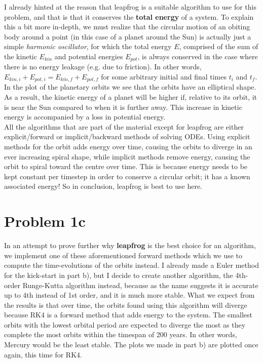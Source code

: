 I already hinted at the reason that leapfrog is a suitable algorithm to use for this problem, and that is that it conserves the \textbf{total energy} of a system. To explain this a bit more in-depth, we must realize that the circular motion of an obiting body around a point (in this case of a planet around the Sun) is actually just a simple \textit{harmonic oscillator}, for which the total energy $E$, comprised of the sum of the kinetic $E_{kin}$ and potential energies $E_{pot}$, is always conserved in the case where there is no energy leakage (e.g. due to friction). In other words, $E_{kin,i} + E_{pot,i} = E_{kin,f} + E_{pot,f}$ for some arbitrary initial and final times $t_i$ and $t_f$. In the plot of the planetary orbits we see that the orbits have an elliptical shape. As a result, the kinetic energy of a planet will be higher if, relative to its orbit, it is near the Sun compared to when it is further away. This increase in kinetic energy is accompanied by a loss in potential energy.\\

All the algorithms that are part of the material except for leapfrog are either explicit/forward or implicit/backward methods of solving ODEs. Using explicit methods for the orbit adds energy over time, causing the orbits to diverge in an ever increasing spiral shape, while implicit methods remove energy, causing the orbit to spiral toward the centre over time. This is because energy needs to be kept constant per timestep in order to conserve a circular orbit; it has a known associated energy! So in conclusion, leapfrog is best to use here. 

\section*{Problem 1c}

In an attempt to prove further why \textbf{leapfrog} is the best choice for an algorithm, we implement one of these aforementioned forward methods which we use to compute the time-evolutions of the orbits instead. I already made a Euler method for the kick-start in part b), but I decide to create another algorithm, the 4th-order Runge-Kutta algorithm instead, because as the name suggests it is accurate up to 4th instead of 1st order, and it is much more stable. What we expect from the results is that over time, the orbits found using this algorithm will diverge because RK4 is a forward method that adds energy to the system. The smallest orbits with the lowest orbital period are expected to diverge the most as they complete the most orbits within the timespan of 200 years. In other words, Mercury would be the least stable. The plots we made in part b) are plotted once again, this time for RK4. 


